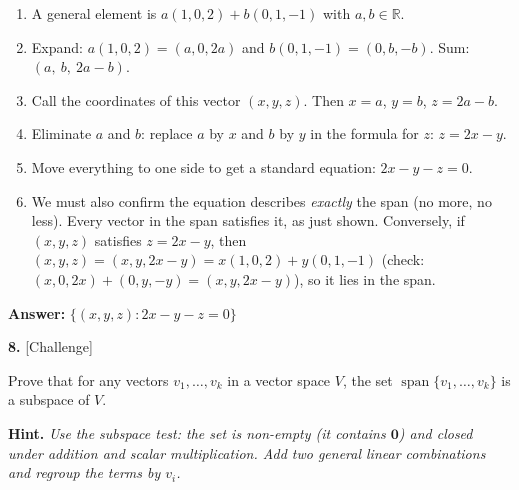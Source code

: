 \documentclass[11pt]{article}
\begin{document}
\begin{tcolorbox}[breakable,colback=ans,colframe=ansb,boxrule=0.5pt,left=4pt,right=4pt,top=2pt,bottom=2pt]\begin{enumerate}[leftmargin=2.2em,itemsep=1pt,topsep=1pt,label=\textbf{Step \arabic*.}]\item A general element is $a(1,0,2)+b(0,1,-1)$ with $a,b\in\mathbb{R}$.
\item Expand: $a(1,0,2)=(a,0,2a)$ and $b(0,1,-1)=(0,b,-b)$. Sum: $(a,\ b,\ 2a-b)$.
\item Call the coordinates of this vector $(x,y,z)$. Then $x=a$, $y=b$, $z=2a-b$.
\item Eliminate $a$ and $b$: replace $a$ by $x$ and $b$ by $y$ in the formula for $z$: $z=2x-y$.
\item Move everything to one side to get a standard equation: $2x-y-z=0$.
\item We must also confirm the equation describes \emph{exactly} the span (no more, no less). Every vector in the span satisfies it, as just shown. Conversely, if $(x,y,z)$ satisfies $z=2x-y$, then $(x,y,z)=(x,y,2x-y)=x(1,0,2)+y(0,1,-1)$ (check: $(x,0,2x)+(0,y,-y)=(x,y,2x-y)$), so it lies in the span.
\end{enumerate}\textbf{Answer:} $\{(x,y,z):2x-y-z=0\}$\end{tcolorbox}
\par\vspace{2pt}
\begin{minipage}{\linewidth}\textbf{8.} \hfill{\scriptsize\color{ink}[Challenge]}\par\nopagebreak Prove that for any vectors $v_1,\dots,v_k$ in a vector space $V$, the set $\operatorname{span}\{v_1,\dots,v_k\}$ is a subspace of $V$.
\par\smallskip\begingroup\small\color{ink}\textbf{Hint.} \textit{Use the subspace test: the set is non-empty (it contains $\mathbf 0$) and closed under addition and scalar multiplication. Add two general linear combinations and regroup the terms by $v_i$.}\endgroup
\end{minipage}\par\nopagebreak
\end{document}
